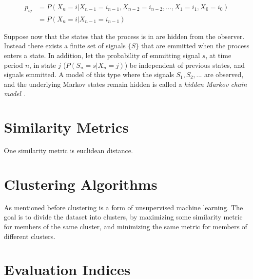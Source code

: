 \begin{equation}
    \begin{split}
        p_{ij} &= P(X_n = i | X_{n-1} = i_{n-1}, X_{n-2} = i_{n-2},..., X_{1} = i_{1}, X_{0} = i_{0}) \\
        &= P(X_n = i| X_{n-1} = i_{n-1})      
    \end{split}
    \label{eq:markov_property}
\end{equation}


Suppose now that the states that the process is in are hidden from the observer. Instead there exists a finite set of signals $\{S\}$ that are emmitted when the process enters a state. In addition, let the probability of emmitting signal $s$, at time period $n$, in state $j$ ($P(S_n = s | X_n = j)$) be independent of previous states, and signals emmitted. A model of this type where the signals $S_1, S_2, ...$ are observed, and the underlying Markov states remain hidden is called a \textit{hidden Markov chain model} \cite{stoch_pros}. 

\section{Similarity Metrics}
One similarity metric is euclidean distance.

\section{Clustering Algorithms}
As mentioned before clustering is a form of unsupervised machine learning. The goal is to divide the dataset into clusters, by maximizing some similarity metric for members of the same cluster, and minimizing the same metric for members of different clusters.

\section{Evaluation Indices} 